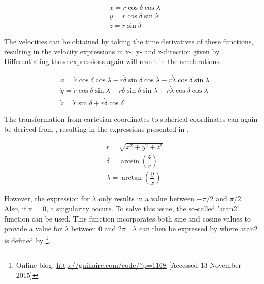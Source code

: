 \begin{equation} \label{eq:sphertocartp}
\begin{split}
& x=r\cos\delta \cos\lambda \\
& y=r\cos\delta \sin\lambda \\
& z=r\sin\delta 
\end{split}
\end{equation}

\noindent
The velocities can be obtained by taking the time derivatives of these functions, resulting in the velocity expressions in x-, y- and z-direction given by . Differentiating those expressions again will result in the accelerations.

\begin{equation} \label{eq:sphertocartv}
\begin{split}
& \dot{x}=\dot{r}\cos\delta \cos\lambda -r\dot{\delta}\sin\delta \cos\lambda -r\dot{\lambda}\cos\delta \sin\lambda \\
& \dot{y}=\dot{r}\cos\delta \sin\lambda -r\dot{\delta}\sin\delta \sin\lambda +r\dot{\lambda}\cos\delta \cos\lambda \\
& \dot{z}=\dot{r}\sin\delta +r\dot{\delta}\cos\delta 
\end{split}
\end{equation}

\noindent
The transformation from cartesian coordinates to spherical coordinates can again be derived from , resulting in the expressions presented in .

\begin{equation} \label{eq:carttospherp}
\begin{split}
& r=\sqrt{x^{2}+y^{2}+z^{2}}\\
& \delta=\arcsin\left(\dfrac{z}{r}\right)\\
& \lambda=\arctan\left(\dfrac{y}{x}\right)
\end{split}
\end{equation}

\noindent
However, the expression for $\lambda$ only results in a value between $-\pi/2$ and $\pi/2$. Also, if x = 0, a singularity occurs. To solve this issue, the so-called 'atan2' function can be used. This function incorporates both sine and cosine values to provide a value for $\lambda$ between 0 and 2$\pi$ \citep{noomen2013basic}. $\lambda$ can then be expressed by  where atan2 is defined by \footnote{Online blog: \url{http://guihaire.com/code/?p=1168} [Accessed 13 November 2015]}.

